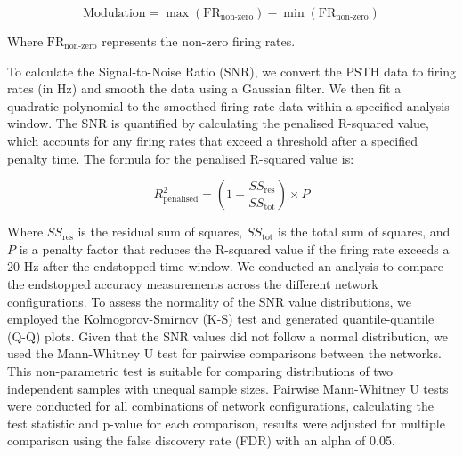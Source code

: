 \documentclass[12pt]{article}
\begin{document}
\[
\text{Modulation} = \max(\text{FR}_{\text{non-zero}}) - \min(\text{FR}_{\text{non-zero}})
\]

Where \(\text{FR}_{\text{non-zero}}\) represents the non-zero firing rates.

To calculate the Signal-to-Noise Ratio (SNR), we convert the PSTH data to firing rates (in Hz) and smooth the data using a Gaussian filter. We then fit a quadratic polynomial to the smoothed firing rate data within a specified analysis window. The SNR is quantified by calculating the penalised R-squared value, which accounts for any firing rates that exceed a threshold after a specified penalty time. The formula for the penalised R-squared value is:

\[
R^2_{\text{penalised}} = \left( 1 - \frac{SS_{\text{res}}}{SS_{\text{tot}}} \right) \times P
\]

Where \(SS_{\text{res}}\) is the residual sum of squares, \(SS_{\text{tot}}\) is the total sum of squares, and \(P\) is a penalty factor that reduces the R-squared value if the firing rate exceeds a 20 Hz after the endstopped time window. We conducted an analysis to compare the endstopped accuracy measurements across the different network configurations. To assess the normality of the SNR value distributions, we employed the Kolmogorov-Smirnov (K-S) test and generated quantile-quantile (Q-Q) plots. Given that the SNR values did not follow a normal distribution, we used the Mann-Whitney U test for pairwise comparisons between the networks. This non-parametric test is suitable for comparing distributions of two independent samples with unequal sample sizes. Pairwise Mann-Whitney U tests were conducted for all combinations of network configurations, calculating the test statistic and p-value for each comparison, results were adjusted for multiple comparison using the false discovery rate (FDR) with an alpha of 0.05.
 
\end{document}
